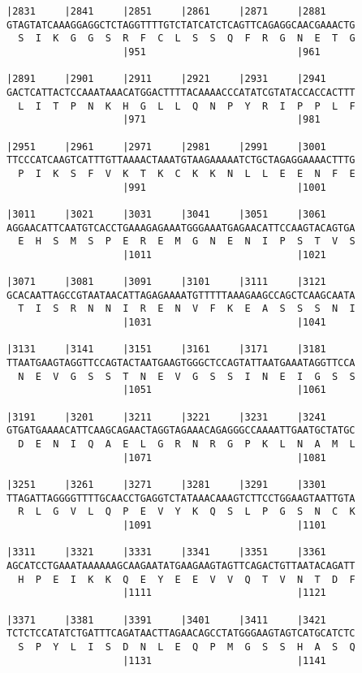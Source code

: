 \documentclass{article}
\begin{document}
\begin{Verbatim}
|2831     |2841     |2851     |2861     |2871     |2881     
GTAGTATCAAAGGAGGCTCTAGGTTTTGTCTATCATCTCAGTTCAGAGGCAACGAAACTG
  S  I  K  G  G  S  R  F  C  L  S  S  Q  F  R  G  N  E  T  G
                    |951                          |961      
  
|2891     |2901     |2911     |2921     |2931     |2941     
GACTCATTACTCCAAATAAACATGGACTTTTACAAAACCCATATCGTATACCACCACTTT
  L  I  T  P  N  K  H  G  L  L  Q  N  P  Y  R  I  P  P  L  F
                    |971                          |981      
  
|2951     |2961     |2971     |2981     |2991     |3001     
TTCCCATCAAGTCATTTGTTAAAACTAAATGTAAGAAAAATCTGCTAGAGGAAAACTTTG
  P  I  K  S  F  V  K  T  K  C  K  K  N  L  L  E  E  N  F  E
                    |991                          |1001     
  
|3011     |3021     |3031     |3041     |3051     |3061     
AGGAACATTCAATGTCACCTGAAAGAGAAATGGGAAATGAGAACATTCCAAGTACAGTGA
  E  H  S  M  S  P  E  R  E  M  G  N  E  N  I  P  S  T  V  S
                    |1011                         |1021     
  
|3071     |3081     |3091     |3101     |3111     |3121     
GCACAATTAGCCGTAATAACATTAGAGAAAATGTTTTTAAAGAAGCCAGCTCAAGCAATA
  T  I  S  R  N  N  I  R  E  N  V  F  K  E  A  S  S  S  N  I
                    |1031                         |1041     
  
|3131     |3141     |3151     |3161     |3171     |3181     
TTAATGAAGTAGGTTCCAGTACTAATGAAGTGGGCTCCAGTATTAATGAAATAGGTTCCA
  N  E  V  G  S  S  T  N  E  V  G  S  S  I  N  E  I  G  S  S
                    |1051                         |1061     
  
|3191     |3201     |3211     |3221     |3231     |3241     
GTGATGAAAACATTCAAGCAGAACTAGGTAGAAACAGAGGGCCAAAATTGAATGCTATGC
  D  E  N  I  Q  A  E  L  G  R  N  R  G  P  K  L  N  A  M  L
                    |1071                         |1081     
  
|3251     |3261     |3271     |3281     |3291     |3301     
TTAGATTAGGGGTTTTGCAACCTGAGGTCTATAAACAAAGTCTTCCTGGAAGTAATTGTA
  R  L  G  V  L  Q  P  E  V  Y  K  Q  S  L  P  G  S  N  C  K
                    |1091                         |1101     
  
|3311     |3321     |3331     |3341     |3351     |3361     
AGCATCCTGAAATAAAAAAGCAAGAATATGAAGAAGTAGTTCAGACTGTTAATACAGATT
  H  P  E  I  K  K  Q  E  Y  E  E  V  V  Q  T  V  N  T  D  F
                    |1111                         |1121     
  
|3371     |3381     |3391     |3401     |3411     |3421     
TCTCTCCATATCTGATTTCAGATAACTTAGAACAGCCTATGGGAAGTAGTCATGCATCTC
  S  P  Y  L  I  S  D  N  L  E  Q  P  M  G  S  S  H  A  S  Q
                    |1131                         |1141     
  

\end{Verbatim}
\end{document}
